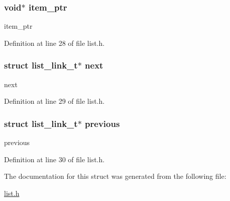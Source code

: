 \subsubsection[{item\+\_\+ptr}]{\setlength{\rightskip}{0pt plus 5cm}void$\ast$ item\+\_\+ptr}\label{structlist__link__t_aec51f80a940b56db16311a7ec2700ed3}


item\+\_\+ptr 



Definition at line 28 of file list.\+h.

\hypertarget{structlist__link__t_ab0e8377d8d84faece172731f34f19398}{}
\subsubsection[{next}]{\setlength{\rightskip}{0pt plus 5cm}struct {\bf list\+\_\+link\+\_\+t}$\ast$ next}\label{structlist__link__t_ab0e8377d8d84faece172731f34f19398}


next 



Definition at line 29 of file list.\+h.

\hypertarget{structlist__link__t_a96afc5312540737fde40567866eef3a7}{}
\subsubsection[{previous}]{\setlength{\rightskip}{0pt plus 5cm}struct {\bf list\+\_\+link\+\_\+t}$\ast$ previous}\label{structlist__link__t_a96afc5312540737fde40567866eef3a7}


previous 



Definition at line 30 of file list.\+h.



The documentation for this struct was generated from the following file\+:\begin{DoxyCompactItemize}
\item 
\hyperlink{list_8h}{list.\+h}\end{DoxyCompactItemize}
